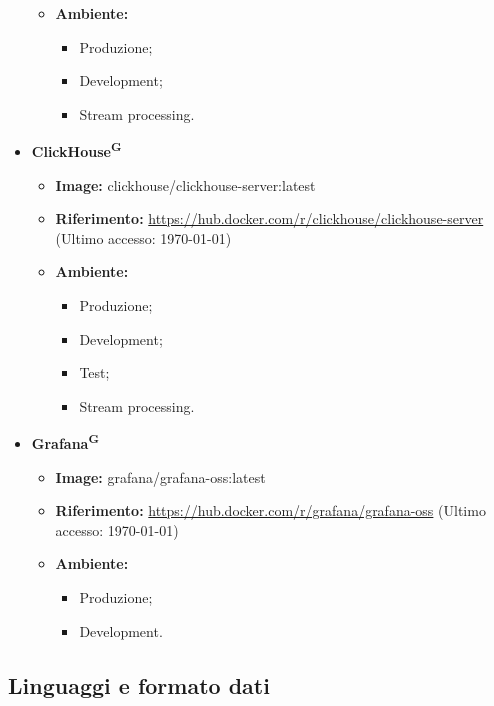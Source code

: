 \documentclass[8pt]{article}
\newcommand{\glossterm}[1]{#1\textsuperscript{G}} %
\begin{document}
\begin{itemize}
\begin{itemize}
        \item \textbf{Ambiente:}
        \begin{itemize}
            \item Produzione;
            \item Development;
            \item Stream processing.
        \end{itemize}
    \end{itemize}
    \item \textbf{\glossterm{ClickHouse}}
    \begin{itemize}
        \item \textbf{Image:} clickhouse/clickhouse-server:latest
        \item \textbf{Riferimento:} \href{https://hub.docker.com/r/clickhouse/clickhouse-server}{\color{myblue}https://hub.docker.com/r/clickhouse/clickhouse-server} (Ultimo accesso: \today)
        \item \textbf{Ambiente:}
        \begin{itemize}
            \item Produzione;
            \item Development;
            \item Test;
            \item Stream processing.
        \end{itemize}
    \end{itemize}
    \item \textbf{\glossterm{Grafana}}
    \begin{itemize}
        \item \textbf{Image:} grafana/grafana-oss:latest
        \item \textbf{Riferimento:} \href{https://hub.docker.com/r/grafana/grafana-oss}{\color{myblue}https://hub.docker.com/r/grafana/grafana-oss} (Ultimo accesso: \today)
        \item \textbf{Ambiente:}
        \begin{itemize}
            \item Produzione;
            \item Development.
        \end{itemize}
    \end{itemize}
\end{itemize}
\subsection{Linguaggi e formato dati}
\end{document}
